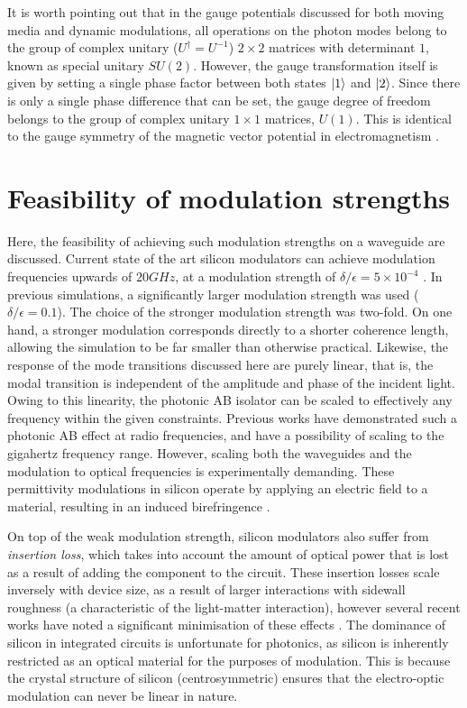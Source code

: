 \label{chapter:discussion}

It is worth pointing out that in the gauge potentials discussed for both moving media and dynamic modulations, all operations on the photon modes belong to the group of complex unitary ($U^\dagger = U^{-1}$) $2 \times 2$ matrices with determinant $1$, known as special unitary $SU(2)$. However, the gauge transformation itself is given by setting a single phase factor between both states $\ket{1}$ and $\ket{2}$. Since there is only a single phase difference that can be set, the gauge degree of freedom belongs to the group of complex unitary $1 \times 1$ matrices, $U(1)$. This is identical to the gauge symmetry of the magnetic vector potential in electromagnetism \cite{Sakurai1995}.

\section{Feasibility of modulation strengths}

Here, the feasibility of achieving such modulation strengths on a waveguide are discussed. Current state of the art silicon modulators can achieve modulation frequencies upwards of $20 GHz$, at a modulation strength of $\delta/\epsilon = 5 \times 10^{-4}$ \cite{Reed2010}. In previous simulations, a significantly larger modulation strength was used ($\delta/\epsilon = 0.1$). The choice of the stronger modulation strength was two-fold. On one hand, a stronger modulation corresponds directly to a shorter coherence length, allowing the simulation to be far smaller than otherwise practical. Likewise, the response of the mode transitions discussed here are purely linear, that is, the modal transition is independent of the amplitude and phase of the incident light. Owing to this linearity, the photonic AB isolator can be scaled to effectively any frequency within the given constraints. Previous works \cite{Fang2013c} have demonstrated such a photonic AB effect at radio frequencies, and have a possibility of scaling to the gigahertz frequency range. However, scaling both the waveguides and the modulation to optical frequencies is experimentally demanding. These permittivity modulations in silicon operate by applying an electric field to a material, resulting in an induced birefringence \cite{Reed2010}.

On top of the weak modulation strength, silicon modulators also suffer from \textit{insertion loss}, which takes into account the amount of optical power that is lost as a result of adding the component to the circuit. These insertion losses scale inversely with device size, as a result of larger interactions with sidewall roughness (a characteristic of the light-matter interaction), however several recent works have noted a significant minimisation of these effects \cite{Gao2006,Ren1992}. The dominance of silicon in integrated circuits is unfortunate for photonics, as silicon is inherently restricted as an optical material for the purposes of modulation. This is because the crystal structure of silicon (centrosymmetric) ensures that the electro-optic modulation can never be linear in nature.

